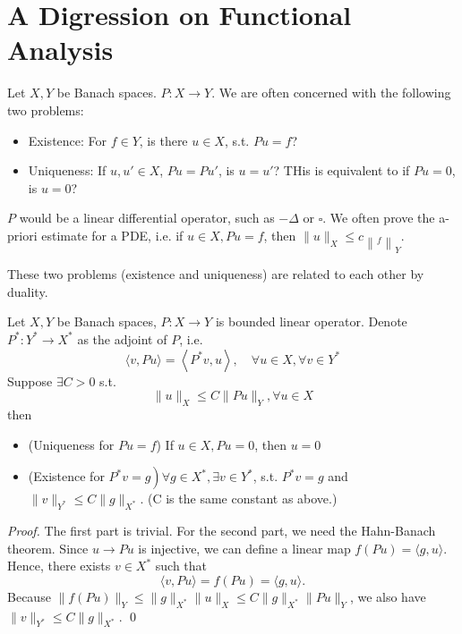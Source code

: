 \newpage
\section{A Digression on Functional Analysis }
Let $X, Y$ be Banach spaces. $P: X \rightarrow Y$. We are often concerned with the following two problems:
\begin{itemize}
    \item Existence: For $f\in Y$, is there $u\in X$, s.t. $Pu=f$?
    \item Uniqueness: If $u,u'\in X$, $Pu= Pu'$, is $u=u'$? THis is equivalent to if $Pu=0$, is $u=0$?
\end{itemize}
$P$ would be a linear differential operator, such as $-\Delta$ or $\square$. We often prove the a-priori estimate for a PDE, i.e. if $u \in X, P u=f$, then $\|u\|_{X} \leq c\left\|_{f}\right\|_{Y}$.

These two problems (existence and uniqueness) are related to each other by duality.

\begin{theorem}
\label{thm: Uniqueness and Existence P}
    Let $X, Y$ be Banach spaces, $P: X \rightarrow Y$ is bounded linear operator. Denote $P^{*}: Y^{*} \rightarrow X^{*}$ as the adjoint of $P$, i.e.
$$
\langle v, P u\rangle=\left\langle P^{*} v, u\right\rangle, \quad \forall u \in X, \forall v \in Y^{*}
$$
Suppose $\exists C>0$ s.t.
$$
\|u\|_{X} \leq C\|P u\|_{Y}, \forall u \in X
$$
then
\begin{itemize}
    \item (Uniqueness for $Pu=f$) If $u\in X, Pu=0$, then $u=0$
    \item (Existence for $\left.P^{*} v=g\right) \forall g \in X^{*}, \exists v \in Y^{*}$, s.t. $P^{*} v=g$ and $\|v\|_{Y^{*}} \leq C\|g\|_{X^{*}}$. (C is the same constant as above.)
\end{itemize}
\end{theorem}
\vspace{0.5em}
\begin{proof}
    The first part is trivial. 
    For the second part, we need the Hahn-Banach theorem. Since $u\to Pu$ is injective, we can define a linear map $f(Pu) = \langle g, u \rangle$.  Hence, there exists $v\in X^*$ such that 
    \[
        \langle v, Pu \rangle = f(Pu) = \langle g,u \rangle. 
    \]
    Because $\|f(Pu)\|_Y \le \|g\|_{X^*} \|u \|_X \le C \|g\|_{X^*} \|Pu\|_{Y}$, we also have $\|v\|_{Y^*} \le C\|g\|_{X^*}$. 
    \qed
\end{proof}

